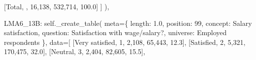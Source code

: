 \documentclass[
  11pt,
  a4paper,
]{article}
\newenvironment{Shaded}{\begin{snugshade}}{\end{snugshade}}
\newcommand{\NormalTok}[1]{\textcolor[rgb]{0.00,0.23,0.31}{#1}}
\newcommand{\OperatorTok}[1]{\textcolor[rgb]{0.37,0.37,0.37}{#1}}
\newcommand{\StringTok}[1]{\textcolor[rgb]{0.13,0.47,0.30}{#1}}
\newcommand{\VariableTok}[1]{\textcolor[rgb]{0.07,0.07,0.07}{#1}}
\begin{document}
\begin{Shaded}
\begin{Highlighting}[]
\NormalTok{                    [}\StringTok{\textquotesingle{}Total\textquotesingle{}}\NormalTok{, }\StringTok{\textquotesingle{}\textquotesingle{}}\NormalTok{, }\StringTok{\textquotesingle{}16,138\textquotesingle{}}\NormalTok{, }\StringTok{\textquotesingle{}532,714\textquotesingle{}}\NormalTok{, }\StringTok{\textquotesingle{}100.0\textquotesingle{}}\NormalTok{]}
\NormalTok{                ]}
\NormalTok{            ),}
            
            \StringTok{\textquotesingle{}LMA6\_13B\textquotesingle{}}\NormalTok{: }\VariableTok{self}\NormalTok{.\_create\_table(}
\NormalTok{                meta}\OperatorTok{=}\NormalTok{\{}
                    \StringTok{\textquotesingle{}length\textquotesingle{}}\NormalTok{: }\StringTok{\textquotesingle{}1.0\textquotesingle{}}\NormalTok{, }\StringTok{\textquotesingle{}position\textquotesingle{}}\NormalTok{: }\StringTok{\textquotesingle{}99\textquotesingle{}}\NormalTok{,}
                    \StringTok{\textquotesingle{}concept\textquotesingle{}}\NormalTok{: }\StringTok{\textquotesingle{}Salary satisfaction\textquotesingle{}}\NormalTok{,}
                    \StringTok{\textquotesingle{}question\textquotesingle{}}\NormalTok{: }\StringTok{\textquotesingle{}Satisfaction with wage/salary?\textquotesingle{}}\NormalTok{,}
                    \StringTok{\textquotesingle{}universe\textquotesingle{}}\NormalTok{: }\StringTok{\textquotesingle{}Employed respondents\textquotesingle{}}
\NormalTok{                \},}
\NormalTok{                data}\OperatorTok{=}\NormalTok{[}
\NormalTok{                    [}\StringTok{\textquotesingle{}Very satisfied\textquotesingle{}}\NormalTok{, }\StringTok{\textquotesingle{}1\textquotesingle{}}\NormalTok{, }\StringTok{\textquotesingle{}2,108\textquotesingle{}}\NormalTok{, }\StringTok{\textquotesingle{}65,443\textquotesingle{}}\NormalTok{, }\StringTok{\textquotesingle{}12.3\textquotesingle{}}\NormalTok{],}
\NormalTok{                    [}\StringTok{\textquotesingle{}Satisfied\textquotesingle{}}\NormalTok{, }\StringTok{\textquotesingle{}2\textquotesingle{}}\NormalTok{, }\StringTok{\textquotesingle{}5,321\textquotesingle{}}\NormalTok{, }\StringTok{\textquotesingle{}170,475\textquotesingle{}}\NormalTok{, }\StringTok{\textquotesingle{}32.0\textquotesingle{}}\NormalTok{],}
\NormalTok{                    [}\StringTok{\textquotesingle{}Neutral\textquotesingle{}}\NormalTok{, }\StringTok{\textquotesingle{}3\textquotesingle{}}\NormalTok{, }\StringTok{\textquotesingle{}2,404\textquotesingle{}}\NormalTok{, }\StringTok{\textquotesingle{}82,605\textquotesingle{}}\NormalTok{, }\StringTok{\textquotesingle{}15.5\textquotesingle{}}\NormalTok{],}

\end{Highlighting}
\end{Shaded}
\end{document}
